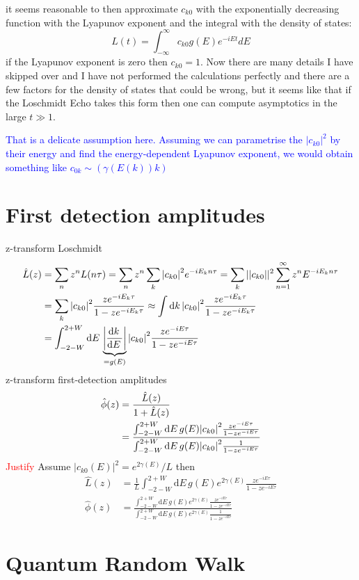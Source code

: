 \documentclass{article}
\numberwithin{equation}{section}
\newcommand{\1}{\mathbb{1}}
\newcommand{\bcomment}[1]{\textcolor{blue}{#1}}
\newcommand{\dint}[1]{\mathrm{d}{#1}\,}
\begin{document}
it seems reasonable to then approximate $c_{k0}$ with the exponentially decreasing function with the Lyapunov exponent and the integral with the density of states:
\begin{equation}
    L(t)=\int_{-\infty}^\infty c_{k0} g(E) e^{-iE t} dE
\end{equation}
if the Lyapunov exponent is zero then $c_{k0}=1$. Now there are many details I have skipped over and I have not performed the calculations perfectly and there are a few factors for the density of states that could be wrong, but it seems like that if the Loschmidt Echo takes this form then one can compute asymptotics in the large $t\gg1$.

\bcomment{That is a delicate assumption here. Assuming we can parametrise the $|c_{k0}|^2$ by their energy and find the energy-dependent Lyapunov exponent, we would obtain something like $c_{0k} \sim \left(\gamma(E(k)) k\right)$}

\section{First detection amplitudes} 
z-transform Loschmidt
\begin{align}
    \hat{L}(z) &= \sum_{n} z^n L(n \tau) = \sum_n z^n  \sum_k \abs{c_{k0}}^2 e^{-iE_k n \tau} = 
    \sum_k   |\abs{c_{k0}}|^2 \sum_{n=1}^{\infty} z^n E^{-i E_k n \tau} \\
    &= \sum_k   \abs{c_{k0}}^2 \frac{z e^{-i E_k \tau}}{1-z e^{-i E_k \tau}} \approx \int \dint{k} \abs{c_{k0}}^2 \frac{z e^{-i E_k \tau}}{1-z e^{-i E_k \tau}} \\
    & = \int_{-2-W}^{2+W} \dint{E}\underbrace{\left|\frac{\dint{k}}{\dint{E}}\right|}_{=g(E)} \abs{c_{k0}}^2 \frac{z e^{-i E \tau}}{1-z e^{-i E \tau}}
\end{align}
z-transform first-detection amplitudes
\begin{align}
    \hat{\phi}(z) &= \frac{\hat{L}(z)}{1+ \hat{L}(z)} \\
    &= \frac{\int_{-2-W}^{2+W} \dint{E}g(E) \abs{c_{k0}}^2 \frac{z e^{-i E \tau}}{1-z e^{-i E \tau}}}{\int_{-2-W}^{2+W} \dint{E} g(E) \abs{c_{k0}}^2 \frac{1}{1-z e^{-i E \tau}}}
\end{align}
\textcolor{red}{Justify} Assume $|c_{k0}(E)|^2 = e^{2\gamma(E)}/L$
then 
\begin{align}
    \hat{L}(z) &= \frac{1}{L}\int_{-2-W}^{2+W} \dint{E}g(E) e^{2\gamma(E)} \frac{z e^{-i E \tau}}{1-z e^{-i E \tau}}\\
    \hat{\phi}(z) &= \frac{\int_{-2-W}^{2+W} \dint{E}g(E) e^{2\gamma(E)} \frac{z e^{-i E \tau}}{1-z e^{-i E \tau}}}{\int_{-2-W}^{2+W} \dint{E}g(E) e^{2\gamma(E)} \frac{1}{1-z e^{-i E \tau}}}
\end{align}
\section{Quantum Random Walk}
\end{document}
